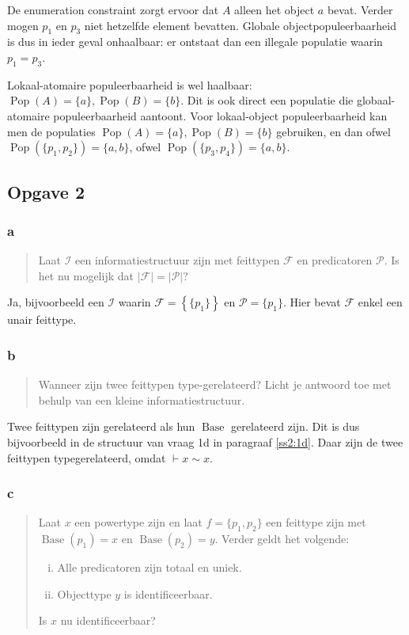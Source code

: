 \documentclass[10pt]{article}
\newcommand{\Base}{\ensuremath{\operatorname{Base}}}
\newcommand{\Pop}{\ensuremath{\operatorname{Pop}}}
\newcommand{\I}{\ensuremath{\mathcal{I}}}
\newcommand{\F}{\ensuremath{\mathcal{F}}}
\renewcommand{\P}{\ensuremath{\mathcal{P}}}
\begin{document}
De enumeration constraint zorgt ervoor dat $A$ alleen het object $a$ bevat. Verder mogen
$p_1$ en $p_3$ niet hetzelfde element bevatten. Globale objectpopuleerbaarheid is dus in 
ieder geval onhaalbaar: er ontstaat dan een illegale populatie waarin $p_1 = p_3$.

Lokaal-atomaire populeerbaarheid is wel haalbaar: $\Pop(A) = \{a\}, \Pop(B)
= \{b\}$. Dit is ook direct een populatie die globaal-atomaire populeerbaarheid
aantoont. Voor lokaal-object populeerbaarheid kan men de populaties $\Pop(A)
= \{a\}, \Pop(B) = \{b\}$ gebruiken, en dan ofwel $\Pop (\{p_1,p_2\})
= \{a,b\}$, ofwel $\Pop (\{p_3,p_4\}) = \{a,b\}$.

\subsection{Opgave 2}

\subsubsection{a}

\begin{quote}
  Laat $\I$ een informatiestructuur zijn met feittypen $\F$ en predicatoren $\P$. Is
  het nu mogelijk dat $|\F| = |\P|$? \cite{tentamen2011}
\end{quote} 

Ja, bijvoorbeeld een $\I$ waarin $\F = \left\{ \{p_1\} \right\}$ en $\P = \{
p_1\}$. Hier bevat $\F$ enkel een unair feittype.

\subsubsection{b}

\begin{quote}
  Wanneer zijn twee feittypen type-gerelateerd? Licht je antwoord toe met
  behulp van een kleine informatiestructuur. \cite{tentamen2011}
\end{quote}

Twee feittypen zijn gerelateerd als hun $\Base$ gerelateerd zijn. Dit is dus
bijvoorbeeld in de structuur van vraag 1d in paragraaf \ref{ss2:1d}. Daar zijn
de twee feittypen typegerelateerd, omdat $\vdash x \sim x$.

\subsubsection{c}

\begin{quote}
  Laat $x$ een powertype zijn en laat $f = \{p_1, p_2\}$ een feittype zijn met
  $\Base(p_1) = x$ en $\Base(p_2) = y$. Verder geldt het volgende: 

  \begin{enumerate}[i.]
    \item Alle predicatoren zijn totaal en uniek.
    \item Objecttype $y$ is identificeerbaar.
  \end{enumerate}
  Is $x$ nu identificeerbaar? \cite{tentamen2011}
\end{quote}
\end{document}
